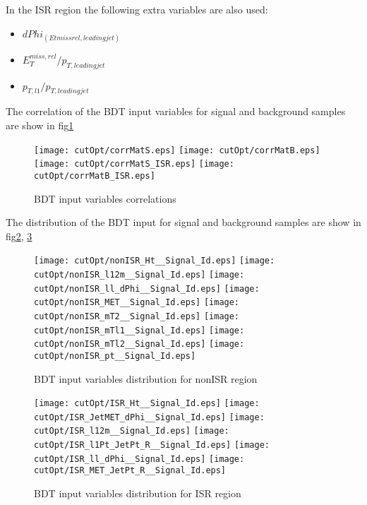 In the ISR region the following extra variables are also used:
\begin{itemize}
\item $dPhi_{(Etmissrel,leading jet)}$
\item $E_T^{miss,rel}/p_{T,leading jet}$
\item $p_{T,l1}/p_{T,leading jet}$
\end{itemize}

The correlation of the BDT input variables for signal and background samples are show in fig\ref{fig:BDT_input_corr}

\begin{figure}
\texttt{[image: cutOpt/corrMatS.eps]}
\texttt{[image: cutOpt/corrMatB.eps]}
\texttt{[image: cutOpt/corrMatS\_ISR.eps]}
\texttt{[image: cutOpt/corrMatB\_ISR.eps]}
\caption{BDT input variables correlations}
\label{fig:BDT_input_corr}
\end{figure}


The distribution of the BDT input for signal and background samples are show in fig\ref{fig:BDT_nonISR_input}, \ref{fig:BDT_ISR_input}

\begin{figure}
\texttt{[image: cutOpt/nonISR\_Ht\_\_Signal\_Id.eps]}
\texttt{[image: cutOpt/nonISR\_l12m\_\_Signal\_Id.eps]}
\texttt{[image: cutOpt/nonISR\_ll\_dPhi\_\_Signal\_Id.eps]}
\texttt{[image: cutOpt/nonISR\_MET\_\_Signal\_Id.eps]}
\texttt{[image: cutOpt/nonISR\_mT2\_\_Signal\_Id.eps]}
\texttt{[image: cutOpt/nonISR\_mTl1\_\_Signal\_Id.eps]}
\texttt{[image: cutOpt/nonISR\_mTl2\_\_Signal\_Id.eps]}
\texttt{[image: cutOpt/nonISR\_pt\_\_Signal\_Id.eps]}
\caption{BDT input variables distribution for nonISR region}
\label{fig:BDT_nonISR_input}
\end{figure}

\begin{figure}
\texttt{[image: cutOpt/ISR\_Ht\_\_Signal\_Id.eps]}
\texttt{[image: cutOpt/ISR\_JetMET\_dPhi\_\_Signal\_Id.eps]}
\texttt{[image: cutOpt/ISR\_l12m\_\_Signal\_Id.eps]}
\texttt{[image: cutOpt/ISR\_l1Pt\_JetPt\_R\_\_Signal\_Id.eps]}
\texttt{[image: cutOpt/ISR\_ll\_dPhi\_\_Signal\_Id.eps]}
\texttt{[image: cutOpt/ISR\_MET\_JetPt\_R\_\_Signal\_Id.eps]}
\caption{BDT input variables distribution for ISR region}
\label{fig:BDT_ISR_input}
\end{figure}

